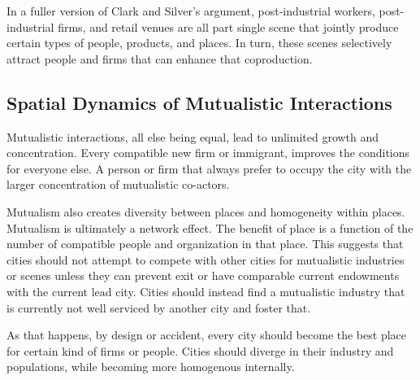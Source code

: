 In a fuller version of Clark and Silver's argument, post-industrial
workers, post-industrial firms, and retail venues are all part single
scene that jointly produce certain types of people, products, and
places. In turn, these scenes selectively attract people and firms
that can enhance that coproduction. 

\subsection*{Spatial Dynamics of Mutualistic Interactions}
Mutualistic interactions, all else being equal, lead to unlimited
growth and concentration. Every compatible new firm or immigrant,
improves the conditions for everyone else. A person or firm that
always prefer to occupy the city with the larger concentration of
mutualistic co-actors.

Mutualism also creates diversity between places and homogeneity within
places. Mutualism is ultimately a network effect. The benefit of place
is a function of the number of compatible people and organization in
that place. This suggests that cities should not attempt to compete
with other cities for mutualistic industries or scenes unless they can
prevent exit or have comparable current endowments with the current
lead city.  Cities should instead find a mutualistic industry that is
currently not well serviced by another city and foster that.

As that happens, by design or accident, every city should become the
best place for certain kind of firms or people. Cities should diverge
in their industry and populations, while becoming more homogenous
internally. 
